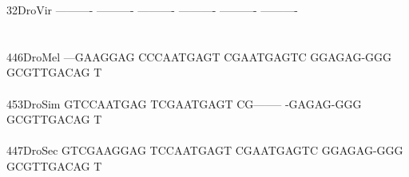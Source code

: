 \documentclass[11pt,twoside,reqno,a4paper]{article}
\begin{document}
{32\hspace*{2\charwidth}DroVir	----------	----------	----------	----------	----------	----------	\\
\hspace*{4\charwidth}\hspace*{7\charwidth}\hspace*{1\charwidth}\hspace*{1\charwidth}\hspace*{1\charwidth}\hspace*{1\charwidth}\hspace*{1\charwidth}\hspace*{1\charwidth}\\
\\
446\hspace*{1\charwidth}DroMel	---GAAGGAG	CCCAATGAGT	CGAATGAGTC	GGAGAG-GGG	GCGTTGACAG	T\\
\hspace*{4\charwidth}\hspace*{7\charwidth}\hspace*{1\charwidth}\hspace*{1\charwidth}\hspace*{1\charwidth}\hspace*{1\charwidth}\hspace*{1\charwidth}\\
453\hspace*{1\charwidth}DroSim	GTCCAATGAG	TCGAATGAGT	CG--------	-GAGAG-GGG	GCGTTGACAG	T\\
\hspace*{4\charwidth}\hspace*{7\charwidth}\hspace*{1\charwidth}\hspace*{1\charwidth}\hspace*{1\charwidth}\hspace*{1\charwidth}\hspace*{1\charwidth}\\
447\hspace*{1\charwidth}DroSec	GTCGAAGGAG	TCCAATGAGT	CGAATGAGTC	GGAGAG-GGG	GCGTTGACAG	T\\
\hspace*{4\charwidth}\hspace*{7\charwidth}\hspace*{1\charwidth}\hspace*{1\charwidth}\hspace*{1\charwidth}\hspace*{1\charwidth}\hspace*{1\charwidth}\\
}
\end{document}
